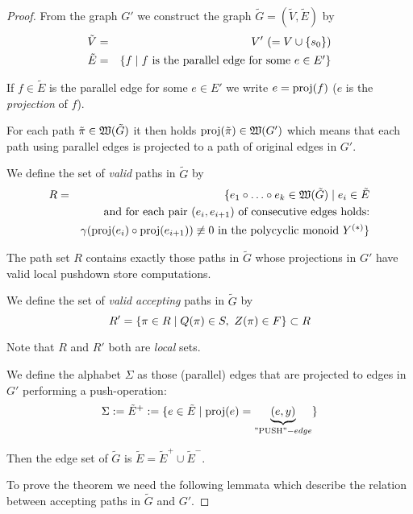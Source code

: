 \begin{proof}
From the graph $G'$ we construct the graph $\tilde{G} = (\tilde{V}, \tilde{E})$
by
\begin{eqnarray*}
\tilde{V} &=& V' \ (=V \cup \mbox{$\{s_0\}$}) \\
\tilde{E} &=& \mbox{$\{f \mid f\text{ is the parallel edge for some $e \in E'$}\}$}
\end{eqnarray*}

If $f \in \tilde{E}$ is the parallel edge for some $e \in E'$ we write $e =
\mathrm{proj}({f})$ ($e$ is the {\em projection} of $f$). 

For each path $\tilde{\pi} \in \mbox{$\mathfrak{W}({\tilde{G}})$}$ it then holds
$\mathrm{proj}({\tilde{\pi}}) \in \mbox{$\mathfrak{W}({G'})$}$ which means that each path using parallel
edges is projected to a path of original edges in $G'$.

We define the set of {\em valid} paths in $\tilde{G}$ by
\begin{eqnarray*}
R &=& \{ e_1 \circ \ldots \circ e_k \in \mbox{$\mathfrak{W}({\tilde{G}})$} \mid e_i \in
\tilde{E} \\
& & \text{and for each pair }(e_i, e_{i+1})\text{ of consecutive edges holds:}\\
& & \gamma(\mathrm{proj}({e_i}) \circ \mathrm{proj}({e_{i+1}})) \not\equiv 0\text{ in the
polycyclic monoid }\mbox{${Y}^{(*)}$} \}
\end{eqnarray*} 

The path set $R$ contains exactly those paths in $\tilde{G}$ whose projections
in $G'$ have valid local pushdown store computations.

We define the set of {\em valid accepting} paths in $\tilde{G}$ by
\begin{equation*}
R' = \mbox{$\{\pi \in R \mid Q(\pi) \in S,\ Z(\pi) \in F\}$} \subset R
\end{equation*}

Note that $R$ and $R'$ both are {\em local} sets.

We define the alphabet $\Sigma$ as those (parallel) edges that are projected to
edges in $G'$ performing a push-operation:
\begin{equation*}
\Sigma := \tilde{E}^+ := \mbox{$\{e \in \tilde{E} \mid \mathrm{proj}({e}) =
\underbrace{(e,y)}_{\text{''PUSH''}-edge}\}$}
\end{equation*}

Then the edge set of $\tilde{G}$ is $\tilde{E} = \tilde{E}^+ \cup
\tilde{E}^-$.

To prove the theorem we need the following lemmata which describe the
relation between accepting paths in $\tilde{G}$ and $G'$.


\end{proof}
